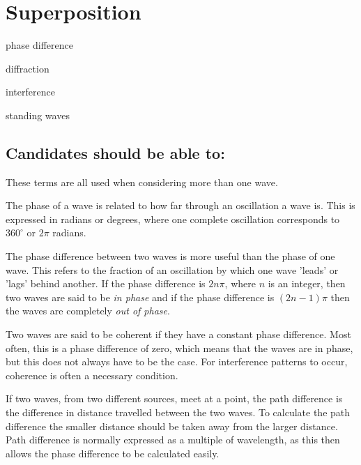 \documentclass[revision-guide.tex]{subfiles}
\begin{document}
\chapter{Superposition}
\begin{content}
\item phase difference
\item diffraction
\item interference
\item standing waves
\end{content}

\section*{Candidates should be able to:}

These terms are all used when considering more than one wave.

The phase of a wave is related to how far through an oscillation a wave is. This is expressed in radians or degrees, where one complete oscillation corresponds to $360^{\circ}$ or $2\pi$ radians.

The phase difference between two waves is more useful than the phase of one wave. This refers to the fraction of an oscillation by which one wave 'leads' or 'lags' behind another. If the phase difference is $2n\pi$, where $n$ is an integer, then two waves are said to be \emph{in phase} and if the phase difference is $(2n-1)\pi$ then the waves are completely \emph{out of phase}.

Two waves are said to be coherent if they have a constant phase difference. Most often, this is a phase difference of zero, which means that the waves are in phase, but this does not always have to be the case. For interference patterns to occur, coherence is often a necessary condition.

If two waves, from two different sources, meet at a point, the path difference is the difference in distance travelled between the two waves. To calculate the path difference the smaller distance should be taken away from the larger distance. Path difference is normally expressed as a multiple of wavelength, as this then allows the phase difference to be calculated easily.
\end{document}

